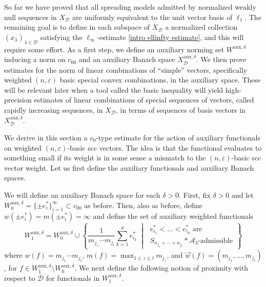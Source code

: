 \documentclass[12pt,a4paper]{amsart}
\newcommand{\bes}{\begin{equation*}}
\newcommand{\ees}{\end{equation*}}
\newcommand{\ep}{\varepsilon}
\theoremstyle{definition}
\theoremstyle{plain}
\begin{document}
So far we have proved that all spreading models admitted by normalized weakly null sequences in $X_\mathcal{D}$ are uniformly equivalent to the unit vector basis of $\ell_1$. The remaining goal is to define in each subspace of $X_\mathcal{D}$ a normalized collection $(x_\lambda)_{\lambda\in\mathcal{D}}$ satisfying the $\ell_\infty$-estimate \eqref{intro ellinfty estimate}, and this will require some effort. As a first step, we define an auxiliary norming set $W^{\text{aux},\delta}$ inducing a norm on $c_{00}$ and an auxiliary Banach space $X_{\mathcal{D}}^{\text{aux},\delta}$. We then prove estimates for the norm of linear combinations of ``simple'' vectors, specifically weighted $(n,\varepsilon)$ basic special convex combinations, in the auxiliary space. These will be relevant later when a tool called the basic inequality will yield high-precision estimates of linear combinations of special sequences of vectors, called rapidly increasing sequences, in $X_{\mathcal{D}}$, in terms of sequences of basis vectors in $X_{\mathcal{D}}^{\text{aux},\delta}$.




We derive in this section a $c_{0}$-type estimate for the action of auxiliary functionals on weighted $(n,\ep)$-basic scc vectors. The idea is that the functional evaluates to something small if its weight is in some sense a mismatch to the $(n,\ep)$-basic scc vector weight. Let us first define the auxiliary functionals and auxiliary Banach spaces.

We will define an auxiliary Banach space for each $\delta>0$. First, fix $\delta>0$ and let $W_{0}^{\text{aux},\delta}=\{\pm e_{i}^{*}\}_{i=1}^{\infty}\subset c_{00}$ as before. Then, also as before, define $w(\pm e^{*}_{i})=m(\pm e^{*}_{i})=\infty$ and define the set of auxiliary weighted functionals
\bes W^{\text{aux},\delta}_{1}=W^{\text{aux},\delta}_{0}\cup\left\{\frac{1}{m_{j_{1}}\cdots m_{j_{l}}}\sum_{k=1}^{d}e^{*}_{i_{k}} \;\middle\vert\; \substack{ e^{*}_{i_{1}}<\ldots<e^{*}_{i_{d}} \text{ are } \\ S_{n_{j_{1}}+\cdots+n_{j_{l}}}\ast\mathcal{A}_{3}\text{-admissible}} \right\} \ees
where $w(f)=m_{j_{1}}\cdots m_{j_{l}}$, $m(f)=\max_{1\leq z\leq l}m_{j_{z}}$, and $\vec w(f) = (m_{j_1},\ldots,m_{j_\ell})$, for $f\in W_{1}^{\text{aux},\delta}\setminus W_{0}^{\text{aux},\delta}$. We next define the following notion of proximity with respect to $\overline{\mathcal{D}}$ for functionals in $W^{\text{aux},\delta}_{1}$.
\end{document}
